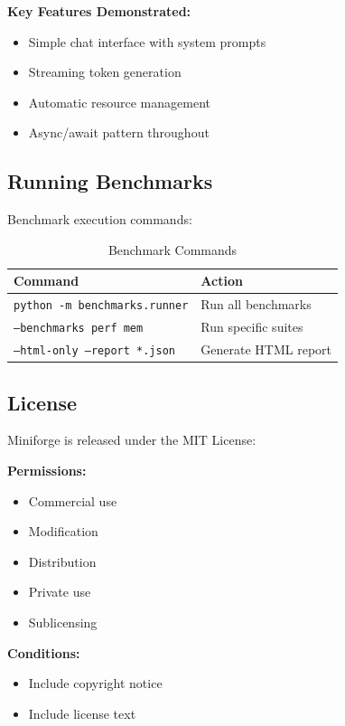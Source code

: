 \textbf{Key Features Demonstrated:}
\begin{itemize}
    \item Simple chat interface with system prompts
    \item Streaming token generation
    \item Automatic resource management
    \item Async/await pattern throughout
\end{itemize}

\subsection{Running Benchmarks}

Benchmark execution commands:

\begin{table}[h]
\centering
\caption{Benchmark Commands}
\label{tab:benchmark_commands}
\begin{tabular}{ll}
\toprule
\textbf{Command} & \textbf{Action} \\
\midrule
\texttt{python -m benchmarks.runner} & Run all benchmarks \\
\texttt{--benchmarks perf mem} & Run specific suites \\
\texttt{--html-only --report *.json} & Generate HTML report \\
\bottomrule
\end{tabular}
\end{table}

\subsection{License}

Miniforge is released under the MIT License:

\textbf{Permissions:}
\begin{itemize}
    \item Commercial use
    \item Modification
    \item Distribution
    \item Private use
    \item Sublicensing
\end{itemize}

\textbf{Conditions:}
\begin{itemize}
    \item Include copyright notice
    \item Include license text
\end{itemize}

